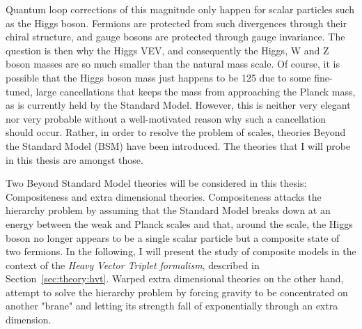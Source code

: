 Quantum loop corrections of this magnitude only happen for scalar particles such as the Higgs boson. Fermions are protected from such divergences through their chiral structure, and gauge bosons are protected through gauge invariance. The question is then why the Higgs VEV, and consequently the Higgs, W and Z boson masses are so much smaller than the natural mass scale.\newline
Of course, it is possible that the Higgs boson mass just happens to be 125 \GeV due to some fine-tuned, large cancellations that keeps the mass from approaching the Planck mass, as is currently held by the Standard Model. However, this is neither very elegant nor very probable without a well-motivated reason why such a cancellation should occur. Rather, in order to resolve the problem of scales, theories Beyond the Standard Model (BSM) have been introduced. The theories that I will probe in this thesis are amongst those.\par
Two Beyond Standard Model theories will be considered in this thesis: Compositeness and extra dimensional theories.
Compositeness attacks the hierarchy problem by assuming that the Standard Model breaks down at an energy between the weak and Planck scales and that, around the \TeV scale, the Higgs boson no longer appears to be a single scalar particle but a composite state of two fermions. In the following, I will present the study of composite models in the context of the \emph{Heavy Vector Triplet formalism}, described in Section~\ref{sec:theory:hvt}. Warped extra dimensional theories on the other hand, attempt to solve the hierarchy problem by forcing gravity to be concentrated on another "brane" and letting its strength fall of exponentially through an extra dimension.

